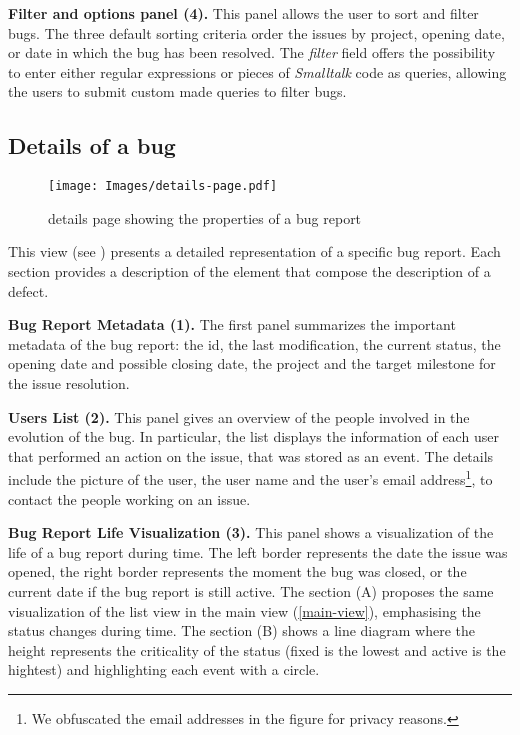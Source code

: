 {\bf Filter and options panel (4).} This panel allows the user to sort and filter bugs. The three default sorting criteria order the issues by project, opening date, or date in which the bug has been resolved. The \textit{filter} field offers the possibility to enter either regular expressions or pieces of {\em Smalltalk} code as queries, allowing the users to submit custom made queries to filter bugs.

\subsection{Details of a bug}

\begin{figure*}[ht]
\begin{center}
\texttt{[image: Images/details-page.pdf]}
\caption{\ib details page showing the properties of a bug report}
\label{fig-inbug-home}
\end{center}
\end{figure*}

This view (see ) presents a detailed representation of a specific bug report. Each section provides a description of the element that compose the description of a defect.

\textbf{Bug Report Metadata (1).} The first panel summarizes the important metadata of the bug report: the id, the last modification, the current status, the opening date and possible closing date, the project and the target milestone for the issue resolution.

\textbf{Users List (2).} This panel gives an overview of the people involved in the evolution of the bug. In particular, the list displays the information of each user that performed an action on the issue, that was stored as an event. The details include the picture of the user, the user name and the user's email address\footnote{We obfuscated the email addresses in the figure for privacy reasons.}, to contact the people working on an issue.

\textbf{Bug Report Life Visualization (3).} This panel shows a visualization of the life of a bug report during time. The left border represents the date the issue was opened, the right border represents the moment the bug was closed, or the current date if the bug report is still active. The section (A) proposes the same visualization of the list view in the main view (\ref{main-view}), emphasising the status changes during time. The section (B) shows a line diagram where the height represents the criticality of the status (\ie fixed is the lowest and active is the hightest) and highlighting each event with a circle.


